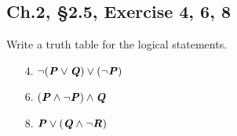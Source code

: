 \documentclass[12pt]{amsart}
\numberwithin{equation}{section}
\theoremstyle{definition}
\theoremstyle{remark}
\begin{document}
\subsection*{Ch.2, \S 2.5,  Exercise 4, 6, 8}  Write a truth table for the logical statements.

\begin{enumerate}

\item[4.]
$ \lnot (\textbf{\textit{P}} \lor \textbf{\textit{Q}}) \lor (\lnot \textbf{\textit{P}}) $

\item[6.]
$ (\textbf{\textit{P}} \land \lnot \textbf{\textit{P}}) \land \textbf{\textit{Q}} $

\item[8.]
$ \textbf{\textit{P}} \lor (\textbf{\textit{Q}} \land \lnot \textbf{\textit{R}}) $

\end{enumerate}
\end{document}
